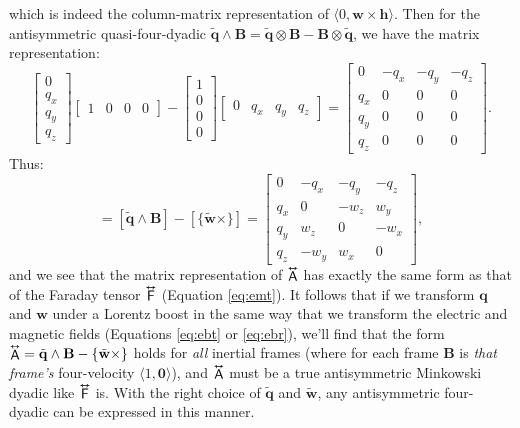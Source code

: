 \documentclass[12pt]{article}
\renewcommand{\vv}[1]{\mathbf{#1}}
\newcommand{\tightoverset}[2]{%
  \mathop{#2}\limits^{\vbox to -.5ex{\kern-0.75ex\hbox{$#1$}\vss}}}
\newcommand{\inlinedy}[1]{\tightoverset{\text{\tiny$\bm\leftrightarrow$}}{#1}}
\newcommand{\capdy}[1]{ \overset{ \text{\tiny$\bm\leftrightarrow$} }{\vphantom{\text{\small{A}}}\smash{#1}} }
\begin{document}
which is indeed the column-matrix representation of $\langle 0, \vv w \times \vv h \rangle$. Then for the antisymmetric quasi-four-dyadic $\tilde{\vv q} \wedge \vv B = \tilde{\vv q} \otimes \vv B - \vv B \otimes \tilde{\vv q}$, we have the matrix representation:
\begin{equation*}
\begin{bmatrix}
0 \\
q_x \\
q_y \\
q_z
\end{bmatrix}
\begin{bmatrix}
1 & 0 & 0 & 0
\end{bmatrix}
-
\begin{bmatrix}
1 \\
0 \\
0 \\
0
\end{bmatrix}
\begin{bmatrix}
0 & q_x & q_y & q_z
\end{bmatrix}
=
\begin{bmatrix}
0 & -q_x & -q_y & -q_z \\
q_x & 0 & 0 & 0 \\
q_y & 0 & 0 & 0 \\
q_z & 0 & 0 & 0
\end{bmatrix}.
\end{equation*}
Thus:
\begin{equation*}
[\capdy{\mathsf{A}}] = [\tilde{\vv q} \wedge \vv B] - [\{ \tilde{\vv w} \times \}]
=
\begin{bmatrix}
0 & -q_x & -q_y & -q_z \\[.5ex]
q_x & 0 & -w_z & w_y \\[.5ex]
q_y & w_z & 0 & -w_x \\[.5ex]
q_z & -w_y & w_x & 0
\end{bmatrix},
\end{equation*}
and we see that the matrix representation of $\inlinedy{\mathsf{A}}$ has exactly the same form as that of the Faraday tensor $\inlinedy{\mathsf{F}}$ (Equation \ref{eq:emt}). It follows that if we transform $\vv q$ and $\vv w$ under a Lorentz boost in the same way that we transform the electric and magnetic fields (Equations \ref{eq:ebt} or \ref{eq:ebr}), we'll find that the form $\inlinedy{\mathsf{A}} = \tilde{\vv q} \wedge \vv B - \{ \tilde{\vv w} \times \}$ holds for \emph{all} inertial frames (where for each frame $\vv B$ is \emph{that frame's} four-velocity $\langle 1, \vv 0 \rangle$), and $\inlinedy{\mathsf{A}}$ must be a true antisymmetric Minkowski dyadic like $\inlinedy{\mathsf{F}}$ is. With the right choice of $\tilde{\vv q}$ and $\tilde{\vv w}$, any antisymmetric four-dyadic can be expressed in this manner.
\end{document}
